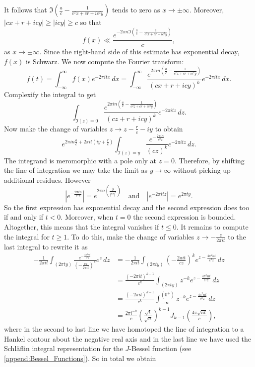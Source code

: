     It follows that $\Im\left(\frac{a}{c}-\frac{1}{c^{2}x+cr+ic^{2}y}\right)$ tends to zero as $x \to \pm\infty$. Moreover, $|cx+r+icy| \ge |icy| \ge c$ so that
    \[
      f(x) \ll \frac{e^{-2\pi n\Im\left(\frac{a}{c}-\frac{1}{c^{2}x+cr+ic^{2}y}\right)}}{c},
    \]
    as $x \to \pm\infty$. Since the right-hand side of this estimate has exponential decay, $f(x)$ is Schwarz. We now compute the Fourier transform:
    \[
      \hat{f}(t) = \int_{-\infty}^{\infty}f(x)e^{-2\pi itx}\,dx = \int_{-\infty}^{\infty}\frac{e^{2\pi in\left(\frac{a}{c}-\frac{1}{c^{2}x+cr+ic^{2}y}\right)}}{(cx+r+icy)^{k}}e^{-2\pi itx}\,dx.
    \]
    Complexify the integral to get
    \[
      \int_{\Im(z) = 0}\frac{e^{2\pi in\left(\frac{a}{c}-\frac{1}{c^{2}z+cr+ic^{2}y}\right)}}{(cz+r+icy)^{k}}e^{-2\pi itz}\,dz.
    \]
    Now make the change of variables $z \to z-\frac{r}{c}-iy$ to obtain
    \[
      e^{2\pi in\frac{a}{c}+2\pi it\left(iy+\frac{r}{c}\right)}\int_{\Im(z) = y}\frac{e^{-\frac{2\pi in}{c^{2}z}}}{(cz)^{k}}e^{-2\pi itz}\,dz.
    \]
    The integrand is meromorphic with a pole only at $z = 0$. Therefore, by shifting the line of integration we may take the limit as $y \to \infty$ without picking up additional residues. However
    \[
      \left|e^{-\frac{2\pi in}{c^{2}z}}\right| = e^{2\pi n\left(\frac{y}{|cz|^{2}}\right)} \quad \text{and} \quad \left|e^{-2\pi itz}\right| = e^{2\pi ty}.
    \]
    So the first expression has exponential decay and the second expression does too if and only if $t < 0$. Moreover, when $t = 0$ the second expression is bounded. Altogether, this means that the integral vanishes if $t \le 0$. It remains to compute the integral for $t \ge 1$. To do this, make the change of variables $z \to - \frac{z}{2\pi it}$ to the last integral to rewrite it as
    \begin{align*}
      -\frac{1}{2\pi it}\int_{(2\pi ty)}\frac{e^{-\frac{4\pi^{2}nt}{c^{2}z}}}{\left(-\frac{cz}{2\pi it}\right)^{k}}e^{z}\,dz &= -\frac{1}{2\pi it}\int_{(2\pi ty)}\left(-\frac{2\pi it}{cz}\right)^{k}e^{z-\frac{4\pi^{2}nt}{c^{2}z}}\,dz \\
      &= \frac{(-2\pi it)^{k-1}}{c^{k}}\int_{(2\pi ty)}z^{-k}e^{z-\frac{4\pi^{2}nt}{c^{2}z}}\,dz \\
      &= \frac{(-2\pi it)^{k-1}}{c^{k}}\int_{-\infty}^{(0^{+})}z^{-k}e^{z-\frac{4\pi^{2}nt}{c^{2}z}}\,dz \\
      &= \frac{2\pi i^{-k}}{c}\left(\frac{\sqrt{t}}{\sqrt{n}}\right)^{k-1}J_{k-1}\left(\frac{4\pi\sqrt{nt}}{c}\right),
    \end{align*}
    where in the second to last line we have homotoped the line of integration to a Hankel contour about the negative real axis and in the last line we have used the Schl\"aflin integral representation for the $J$-Bessel function (see \cref{append:Bessel_Functions}). So in total we obtain
